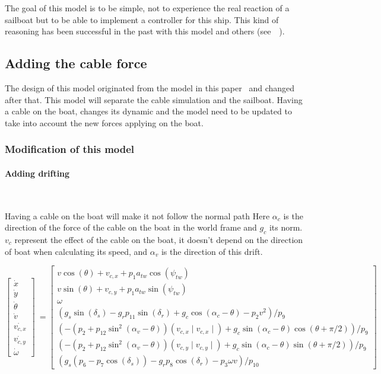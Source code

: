 The goal of this model is to be simple, not to experience the real reaction of a sailboat but
to be able to implement a controller for this ship. This kind of reasoning has been successful in the past 
with this model and others (see~\cite{LeBars2013}~\cite{Melin2016}).

\subsection{Adding the cable force}

The design of this model originated from the model in this paper~\cite{Jaulin2015} and changed after that.
This model will separate the cable simulation and the sailboat. Having a cable on the boat, changes its dynamic 
and the model need to be updated to take into account the new forces applying on the boat.
\subsubsection{Modification of this model}
\paragraph*{Adding drifting}
~\\
\hskip7mm 

Having a cable on the boat will make it not follow the normal path 
Here $\alpha_{c}$ is the direction of the force of the cable on the boat in the world frame and $g_c$ its norm.
$v_c$ represent the effect of the cable on the boat, it doesn't depend on the direction of boat when calculating its speed, and $\alpha_{v}$ is the direction of this drift. 


\begin{equation}
\begin{bmatrix}
\dot{x}\\
\dot{y}\\
\dot{\theta}\\
\dot{v}\\
\dot{v_{c,x}}\\
\dot{v_{c,y}}\\
\dot{\omega}
\end{bmatrix}\  = \begin{bmatrix}
v \cos(\theta)+v_{c,x}+p_1 a_{tw} \cos(\psi_{tw})\\
v \sin(\theta)+v_{c,y}+p_1 a_{tw} \sin(\psi_{tw})\\
\omega\\
(g_s \sin(\delta_s)-g_r p_{11} \sin(\delta_r)+ g_c \cos(\alpha_c-\theta) - p_2 v^2)/p_9\\
(-(p_2+p_{12} \sin^2(\alpha_v-\theta))(v_{c,x} \mid v_{c,x} \mid ) + g_c \sin(\alpha_{c} -\theta) \cos(\theta+\pi/2))/p_9\\
(-(p_2+p_{12} \sin^2(\alpha_v-\theta))(v_{c,y} \mid v_{c,y} \mid ) + g_c \sin(\alpha_{c} -\theta) \sin(\theta+\pi/2))/p_9\\
(g_s(p_6-p_7\cos(\delta_s))-g_r p_8 \cos(\delta_r)-p_3 \omega v)/p_{10}
\end{bmatrix}
\end{equation}

